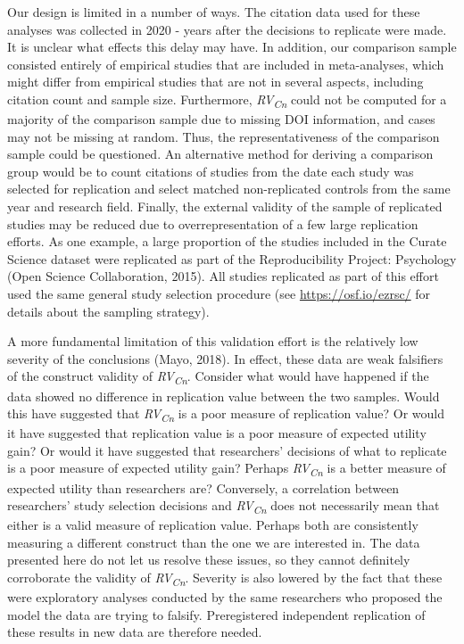 \documentclass[
  english,
  man,floatsintext]{apa6}
\begin{document}
Our design is limited in a number of ways. The citation data used for these analyses was collected in 2020 - years after the decisions to replicate were made. It is unclear what effects this delay may have. In addition, our comparison sample consisted entirely of empirical studies that are included in meta-analyses, which might differ from empirical studies that are not in several aspects, including citation count and sample size. Furthermore, \emph{RV\textsubscript{Cn}} could not be computed for a majority of the comparison sample due to missing DOI information, and cases may not be missing at random. Thus, the representativeness of the comparison sample could be questioned. An alternative method for deriving a comparison group would be to count citations of studies from the date each study was selected for replication and select matched non-replicated controls from the same year and research field. Finally, the external validity of the sample of replicated studies may be reduced due to overrepresentation of a few large replication efforts. As one example, a large proportion of the studies included in the Curate Science dataset were replicated as part of the Reproducibility Project: Psychology (Open Science Collaboration, 2015). All studies replicated as part of this effort used the same general study selection procedure (see \url{https://osf.io/ezrsc/} for details about the sampling strategy).

A more fundamental limitation of this validation effort is the relatively low severity of the conclusions (Mayo, 2018). In effect, these data are weak falsifiers of the construct validity of \emph{RV\textsubscript{Cn}}. Consider what would have happened if the data showed no difference in replication value between the two samples. Would this have suggested that \emph{RV\textsubscript{Cn}} is a poor measure of replication value? Or would it have suggested that replication value is a poor measure of expected utility gain? Or would it have suggested that researchers' decisions of what to replicate is a poor measure of expected utility gain? Perhaps \emph{RV\textsubscript{Cn}} is a better measure of expected utility than researchers are? Conversely, a correlation between researchers' study selection decisions and \emph{RV\textsubscript{Cn}} does not necessarily mean that either is a valid measure of replication value. Perhaps both are consistently measuring a different construct than the one we are interested in. The data presented here do not let us resolve these issues, so they cannot definitely corroborate the validity of \emph{RV\textsubscript{Cn}}. Severity is also lowered by the fact that these were exploratory analyses conducted by the same researchers who proposed the model the data are trying to falsify. Preregistered independent replication of these results in new data are therefore needed.
\end{document}
